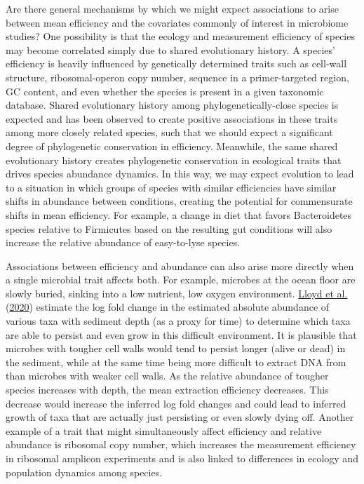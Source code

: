 \documentclass[
]{article}
\theoremstyle{definition}
\theoremstyle{definition}
\theoremstyle{definition}
\theoremstyle{definition}
\theoremstyle{remark}
\begin{document}
Are there general mechanisms by which we might expect associations to arise between mean efficiency and the covariates commonly of interest in microbiome studies?
One possibility is that the ecology and measurement efficiency of species may become correlated simply due to shared evolutionary history.
A species' efficiency is heavily influenced by genetically determined traits such as cell-wall structure, ribosomal-operon copy number, sequence in a primer-targeted region, GC content, and even whether the species is present in a given taxonomic database.
Shared evolutionary history among phylogenetically-close species is expected and has been observed to create positive associations in these traits among more closely related species, such that we should expect a significant degree of phylogenetic conservation in efficiency.
Meanwhile, the same shared evolutionary history creates phylogenetic conservation in ecological traits that drives species abundance dynamics.
In this way, we may expect evolution to lead to a situation in which groups of species with similar efficiencies have similar shifts in abundance between conditions, creating the potential for commensurate shifts in mean efficiency.
For example, a change in diet that favors Bacteroidetes species relative to Firmicutes based on the resulting gut conditions will also increase the relative abundance of easy-to-lyse species.

Associations between efficiency and abundance can also arise more directly when a single microbial trait affects both.
For example, microbes at the ocean floor are slowly buried, sinking into a low nutrient, low oxygen environment.
\protect\hyperlink{ref-lloyd2020evid}{Lloyd et al.} (\protect\hyperlink{ref-lloyd2020evid}{2020}) estimate the log fold change in the estimated absolute abundance of various taxa with sediment depth (as a proxy for time) to determine which taxa are able to persist and even grow in this difficult environment.
It is plausible that microbes with tougher cell walls would tend to persist longer (alive or dead) in the sediment, while at the same time being more difficult to extract DNA from than microbes with weaker cell walls.
As the relative abundance of tougher species increases with depth, the mean extraction efficiency decreases.
This decrease would increase the inferred log fold changes and could lead to inferred growth of taxa that are actually just persisting or even slowly dying off.
Another example of a trait that might simultaneously affect efficiency and relative abundance is ribosomal copy number, which increases the measurement efficiency in ribosomal amplicon experiments and is also linked to differences in ecology and population dynamics among species.
\end{document}

